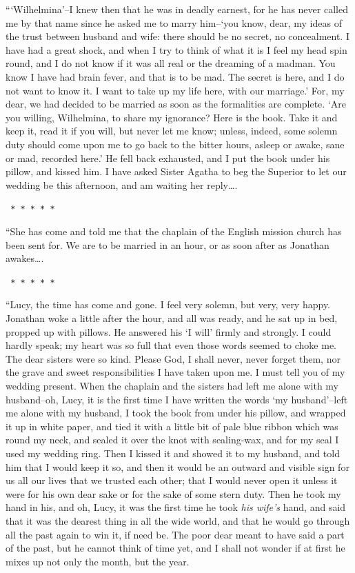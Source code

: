 \documentclass[12pt,openright]{book}
\begin{document}
“‘Wilhelmina’–I knew then that he was in deadly earnest, for he has never called me by that name since he asked me to marry him–‘you know, dear, my ideas of the trust between husband and wife: there should be no secret, no concealment. I have had a great shock, and when I try to think of what it is I feel my head spin round, and I do not know if it was all real or the dreaming of a madman. You know I have had brain fever, and that is to be mad. The secret is here, and I do not want to know it. I want to take up my life here, with our marriage.’ For, my dear, we had decided to be married as soon as the formalities are complete. ‘Are you willing, Wilhelmina, to share my ignorance? Here is the book. Take it and keep it, read it if you will, but never let me know; unless, indeed, some solemn duty should come upon me to go back to the bitter hours, asleep or awake, sane or mad, recorded here.’ He fell back exhausted, and I put the book under his pillow, and kissed him. I have asked Sister Agatha to beg the Superior to let our wedding be this afternoon, and am waiting her reply….

\texttt{   *       *       *       *       *}

“She has come and told me that the chaplain of the English mission church has been sent for. We are to be married in an hour, or as soon after as Jonathan awakes….

\texttt{   *       *       *       *       *}

“Lucy, the time has come and gone. I feel very solemn, but very, very happy. Jonathan woke a little after the hour, and all was ready, and he sat up in bed, propped up with pillows. He answered his ‘I will’ firmly and strongly. I could hardly speak; my heart was so full that even those words seemed to choke me. The dear sisters were so kind. Please God, I shall never, never forget them, nor the grave and sweet responsibilities I have taken upon me. I must tell you of my wedding present. When the chaplain and the sisters had left me alone with my husband–oh, Lucy, it is the first time I have written the words ‘my husband’–left me alone with my husband, I took the book from under his pillow, and wrapped it up in white paper, and tied it with a little bit of pale blue ribbon which was round my neck, and sealed it over the knot with sealing-wax, and for my seal I used my wedding ring. Then I kissed it and showed it to my husband, and told him that I would keep it so, and then it would be an outward and visible sign for us all our lives that we trusted each other; that I would never open it unless it were for his own dear sake or for the sake of some stern duty. Then he took my hand in his, and oh, Lucy, it was the first time he took \textit{his wife’s} hand, and said that it was the dearest thing in all the wide world, and that he would go through all the past again to win it, if need be. The poor dear meant to have said a part of the past, but he cannot think of time yet, and I shall not wonder if at first he mixes up not only the month, but the year.
\end{document}
